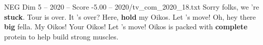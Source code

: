 \begin{textsample}{NEG Dim 5 – 2020 – Score -5.00 – 2020/tv\_com\_2020\_18.txt}  \label{ex:f5_neg_061}
Sorry folks, we 're \textbf{stuck}.
Tour is over.
It 's over?
Here, \textbf{hold} my Oikos.
Let 's move!
Oh, hey there \textbf{big} fella.
My Oikos!
Your Oikos!
Let 's move!
Oikos is packed with \textbf{complete} protein to help build strong muscles.

\end{textsample}
